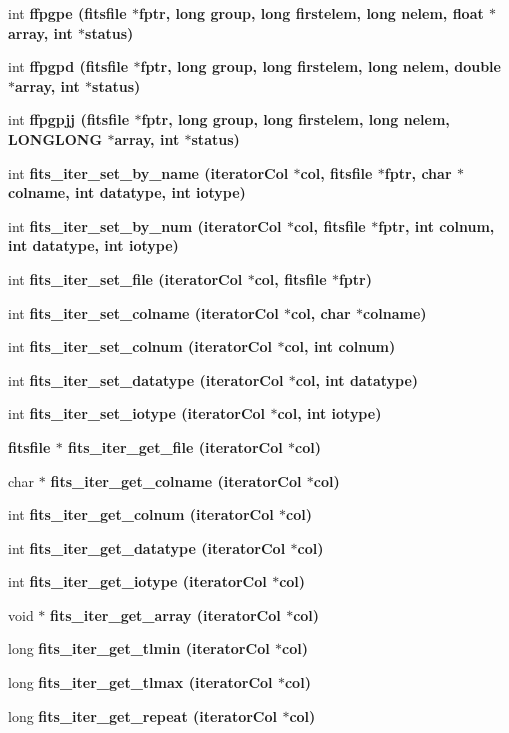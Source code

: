 \begin{CompactItemize}
\item 
int \bf{ffpgpe} (\bf{fitsfile} $\ast$fptr, long group, long firstelem, long nelem, float $\ast$array, int $\ast$status)
\item 
int \bf{ffpgpd} (\bf{fitsfile} $\ast$fptr, long group, long firstelem, long nelem, double $\ast$array, int $\ast$status)
\item 
int \bf{ffpgpjj} (\bf{fitsfile} $\ast$fptr, long group, long firstelem, long nelem, \bf{LONGLONG} $\ast$array, int $\ast$status)
\item 
int \bf{fits\_\-iter\_\-set\_\-by\_\-name} (\bf{iterator\-Col} $\ast$col, \bf{fitsfile} $\ast$fptr, char $\ast$colname, int \bf{datatype}, int iotype)
\item 
int \bf{fits\_\-iter\_\-set\_\-by\_\-num} (\bf{iterator\-Col} $\ast$col, \bf{fitsfile} $\ast$fptr, int colnum, int \bf{datatype}, int iotype)
\item 
int \bf{fits\_\-iter\_\-set\_\-file} (\bf{iterator\-Col} $\ast$col, \bf{fitsfile} $\ast$fptr)
\item 
int \bf{fits\_\-iter\_\-set\_\-colname} (\bf{iterator\-Col} $\ast$col, char $\ast$colname)
\item 
int \bf{fits\_\-iter\_\-set\_\-colnum} (\bf{iterator\-Col} $\ast$col, int colnum)
\item 
int \bf{fits\_\-iter\_\-set\_\-datatype} (\bf{iterator\-Col} $\ast$col, int \bf{datatype})
\item 
int \bf{fits\_\-iter\_\-set\_\-iotype} (\bf{iterator\-Col} $\ast$col, int iotype)
\item 
\bf{fitsfile} $\ast$ \bf{fits\_\-iter\_\-get\_\-file} (\bf{iterator\-Col} $\ast$col)
\item 
char $\ast$ \bf{fits\_\-iter\_\-get\_\-colname} (\bf{iterator\-Col} $\ast$col)
\item 
int \bf{fits\_\-iter\_\-get\_\-colnum} (\bf{iterator\-Col} $\ast$col)
\item 
int \bf{fits\_\-iter\_\-get\_\-datatype} (\bf{iterator\-Col} $\ast$col)
\item 
int \bf{fits\_\-iter\_\-get\_\-iotype} (\bf{iterator\-Col} $\ast$col)
\item 
void $\ast$ \bf{fits\_\-iter\_\-get\_\-array} (\bf{iterator\-Col} $\ast$col)
\item 
long \bf{fits\_\-iter\_\-get\_\-tlmin} (\bf{iterator\-Col} $\ast$col)
\item 
long \bf{fits\_\-iter\_\-get\_\-tlmax} (\bf{iterator\-Col} $\ast$col)
\item 
long \bf{fits\_\-iter\_\-get\_\-repeat} (\bf{iterator\-Col} $\ast$col)

\end{CompactItemize}

